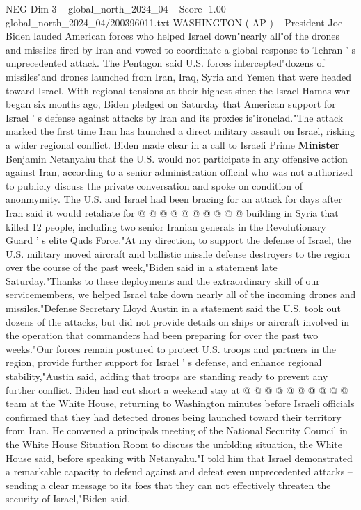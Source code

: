 \begin{textsample}{NEG Dim 3 – global\_north\_2024\_04 – Score -1.00 – global\_north\_2024\_04/200396011.txt}  \label{ex:f3_neg_386}
WASHINGTON ( AP ) -- President Joe Biden lauded American forces who helped Israel down"nearly all"of the drones and missiles fired by Iran and vowed to coordinate a global response to Tehran ' s unprecedented attack.
The Pentagon said U.S. forces intercepted"dozens of missiles"and drones launched from Iran, Iraq, Syria and Yemen that were headed toward Israel.
With regional tensions at their highest since the Israel-Hamas war began six months ago, Biden pledged on Saturday that American support for Israel ' s defense against attacks by Iran and its proxies is"ironclad."The attack marked the first time Iran has launched a direct military assault on Israel, risking a wider regional conflict.
Biden made clear in a call to Israeli Prime \textbf{Minister} Benjamin Netanyahu that the U.S. would not participate in any offensive action against Iran, according to a senior administration official who was not authorized to publicly discuss the private conversation and spoke on condition of anonmymity.
The U.S. and Israel had been bracing for an attack for days after Iran said it would retaliate for @ @ @ @ @ @ @ @ @ @ building in Syria that killed 12 people, including two senior Iranian generals in the Revolutionary Guard ' s elite Quds Force."At my direction, to support the defense of Israel, the U.S. military moved aircraft and ballistic missile defense destroyers to the region over the course of the past week,"Biden said in a statement late Saturday."Thanks to these deployments and the extraordinary skill of our servicemembers, we helped Israel take down nearly all of the incoming drones and missiles."Defense Secretary Lloyd Austin in a statement said the U.S. took out dozens of the attacks, but did not provide details on ships or aircraft involved in the operation that commanders had been preparing for over the past two weeks."Our forces remain postured to protect U.S. troops and partners in the region, provide further support for Israel ' s defense, and enhance regional stability,"Austin said, adding that troops are standing ready to prevent any further conflict.
Biden had cut short a weekend stay at @ @ @ @ @ @ @ @ @ @ team at the White House, returning to Washington minutes before Israeli officials confirmed that they had detected drones being launched toward their territory from Iran.
He convened a principals meeting of the National Security Council in the White House Situation Room to discuss the unfolding situation, the White House said, before speaking with Netanyahu."I told him that Israel demonstrated a remarkable capacity to defend against and defeat even unprecedented attacks -- sending a clear message to its foes that they can not effectively threaten the security of Israel,"Biden said.

\end{textsample}
